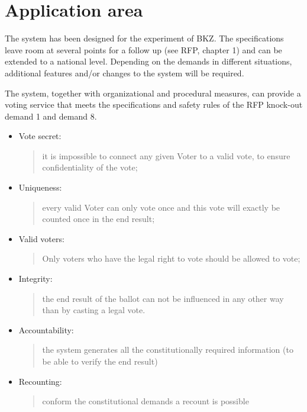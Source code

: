\section{Application area}\label{sec1:application-area}

The system has been designed for the experiment of BKZ. The
specifications leave room at several points for a follow up (see RFP,
chapter 1) and can be extended to a national level. Depending on the
demands in different situations, additional features and/or changes to
the system will be required. 

The system, together with organizational and procedural measures, can
provide a voting service that meets the specifications and safety
rules of the RFP knock-out demand 1 and demand 8.
\begin{itemize}

\item Vote secret:
\begin{quote}
it is impossible to connect any given Voter to a valid vote, to
ensure confidentiality of the vote;
\end{quote}

\item Uniqueness:
\begin{quote}
every valid Voter can only vote once and this vote will exactly be
counted once in the end result;
\end{quote}

\item Valid voters:
\begin{quote}
Only voters who have the legal right to vote should be allowed to vote;
\end{quote}

\item Integrity:
\begin{quote}
the end result of the ballot can not be influenced in any other way
than by casting a legal vote.
\end{quote}

\item Accountability:
\begin{quote}
the system generates all the constitutionally required
information (to be able to verify the end result)
\end{quote}

\item Recounting:
\begin{quote}
conform the constitutional demands a recount is possible
\end{quote}


\end{itemize}
